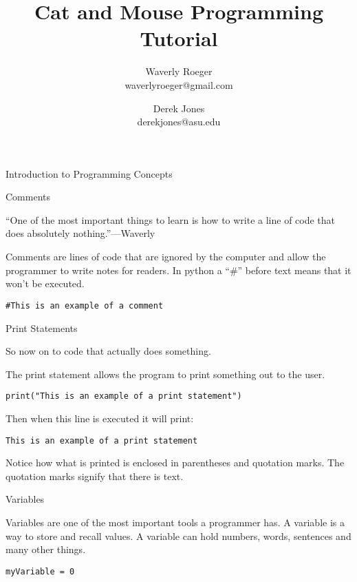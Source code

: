 \documentclass[12pt,oneside]{article}
\newcommand{\q}[1]{``#1''}
\newcommand{\subsectitle}[1]{
  \begin{flushleft}{\large#1}\end{flushleft}
}
\newcommand{\sectitlenonewpage}[1]{
  \begin{flushleft}{\Large#1}\end{flushleft}
}
\begin{document}
\title{\Huge Cat and Mouse Programming Tutorial}
\author{Waverly Roeger\\\normalsize waverlyroeger@gmail.com \and Derek Jones\\\normalsize derekjones@asu.edu}
\date{}

\maketitle

\sectitlenonewpage{Introduction to Programming Concepts}

\subsectitle{Comments}

\q{One of the most important things to learn is how to write a line of code that does absolutely nothing.}---Waverly

Comments are lines of code that are ignored by the computer and allow the programmer to write notes for readers. In python a \q{\#} before text means that it won't be executed.

\begin{lstlisting}
#This is an example of a comment
\end{lstlisting}

\subsectitle{Print Statements}

So now on to code that actually does something. 

The print statement allows the program to print something out to the user.

\begin{lstlisting}
print("This is an example of a print statement")
\end{lstlisting}

Then when this line is executed it will print:

\begin{lstlisting}
This is an example of a print statement
\end{lstlisting}

Notice how what is printed is enclosed in parentheses and quotation marks. The quotation marks signify that there is text. 

\subsectitle{Variables}

Variables are one of the most important tools a programmer has. A variable is a way to store and recall values. A variable can hold numbers, words, sentences and many other things. 


\begin{lstlisting}
myVariable = 0
\end{lstlisting}
\end{document}
